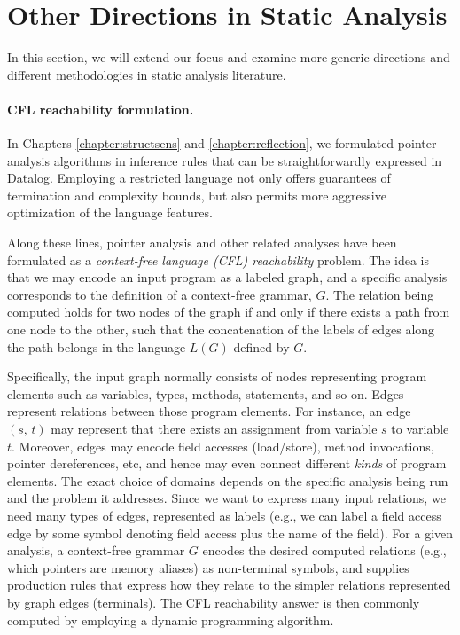 \section{Other Directions in Static Analysis}
\label{related:sect/misc}

In this section, we will extend our focus and examine more generic
directions and different methodologies in static analysis literature.



\paragraph{CFL reachability formulation.} In Chapters
\ref{chapter:structsens} and \ref{chapter:reflection}, we formulated
pointer analysis algorithms in inference rules that can be
straightforwardly expressed in Datalog. Employing a restricted
language not only offers guarantees of termination and complexity
bounds, but also permits more aggressive optimization of the language
features.

Along these lines, pointer analysis and other related analyses have
been formulated as a \emph{context-free language (CFL) reachability}
problem. The idea is that we may encode an input program as a labeled
graph, and a specific analysis corresponds to the definition of a
context-free grammar, \(G\). The relation being computed holds for two
nodes of the graph if and only if there exists a path from one node to
the other, such that the concatenation of the labels of edges along
the path belongs in the language \(L(G)\) defined by \(G\).

Specifically, the input graph normally consists of nodes representing
program elements such as variables, types, methods, statements, and so
on. Edges represent relations between those program elements. For
instance, an edge \((s,\,t)\) may represent that there exists an
assignment from variable \(s\) to variable \(t\). Moreover, edges may
encode field accesses (load/store), method invocations, pointer
dereferences, etc, and hence may even connect different \emph{kinds}
of program elements. The exact choice of domains depends on the
specific analysis being run and the problem it addresses. Since we
want to express many input relations, we need many types of edges,
represented as labels (e.g., we can label a field access edge by some
symbol denoting field access plus the name of the field).  For a given
analysis, a context-free grammar \(G\) encodes the desired computed
relations (e.g., which pointers are memory aliases) as non-terminal
symbols, and supplies production rules that express how they relate to
the simpler relations represented by graph edges (terminals). The CFL
reachability answer is then commonly computed by employing a dynamic
programming algorithm.


